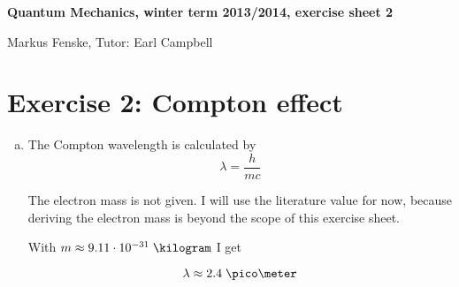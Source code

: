 \documentclass[a4paper,german,12pt,smallheadings]{scrartcl}
\begin{document}
\begin{center}
\bfseries %
\sffamily %
\vspace{-40pt}
Quantum Mechanics, winter term 2013/2014, exercise sheet 2

Markus Fenske, Tutor: Earl Campbell
\vspace{-10pt}
\end{center}

\section*{Exercise 2: Compton effect}

\begin{enumerate}[a)]
  \item
    The Compton wavelength is calculated by
    \begin{equation*}
      \lambda = \frac{h}{mc}
    \end{equation*}

    The electron mass is not given. I will use the literature value for now,
    because deriving the electron mass is beyond the scope of this exercise
    sheet.

    With $m \approx 9.11 \cdot 10^{-31} \; \kilogram$ I get

    \begin{equation*}
      \lambda \approx 2.4 \; \pico\meter
    \end{equation*}
\end{enumerate}
\end{document}
